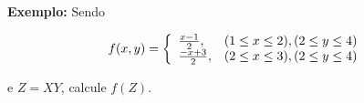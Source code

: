 \documentclass[a4paper,12pt]{report}
\begin{document}
{\textbf{Exemplo:} Sendo

$$
f(x,y) =
\left\{%
\begin{array}{ll}
    \frac{x-1}{2} , & \hbox{$(1 \leq x \leq 2), (2\leq y \leq 4)$} \\
    \frac{-x+3}{2}, & \hbox{$(2 \leq x \leq 3), (2\leq y \leq 4)$} \\
\end{array}%
\right.
$$

e $Z=XY$, calcule $f(Z)$.





















}
\end{document}
